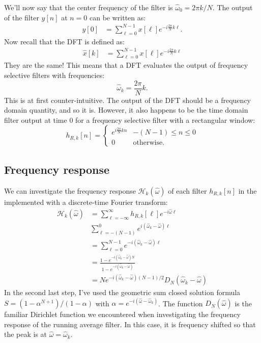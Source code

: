 We'll now say that the center frequency of the filter is $\hat{\omega}_0 = 2\pi k/N$. 
The output of the filter $y[n]$ at $n=0$ can be written as:
\begin{align}
    y[0] & = \sum_{\ell=0}^{N-1} x[\ell] e^{-i\frac{2\pi}{N}k \ell }.
\end{align}
Now recall that the DFT is defined as:
\begin{align}
    \hat{x}[k] & = \sum_{\ell=0}^{N-1} x[\ell]e^{-i \frac{2\pi}{N}k \ell }
\end{align}
They are the same! This means that a DFT evaluates the output of
frequency selective filters with frequencies:
\begin{equation}
    \boxed{
        \hat{\omega}_{k}=\frac{2\pi}{N}k.
    }
\end{equation}
This is at first counter-intuitive. The output of the DFT should be a
frequency domain quantity, and so it is. However, it also happens to
be the time domain filter output at time $0$ for a frequency selective
filter with a rectangular window:
\begin{equation}
    h_{R,k}[n] =\left\{ \begin{array}{cc}
        e^{i \frac{2\pi}{N}k n} & -(N-1) \le n \le 0  \\
        0                       & \mathrm{otherwise}.
    \end{array}
    \right.
\end{equation}

\subsection{Frequency response}

We can investigate the frequency response
$\mathcal{H}_{k}(\hat{\omega})$ of each filter $h_{R,k}[n]$ in
the  implemented with a discrete-time Fourier transform:
\begin{align}
    \mathcal{H}_k(\hat{\omega}) & = \sum_{\ell=-\infty}^{\infty} h_{R,k}[\ell] e^{-i \hat{\omega} \ell}                      \\
                                & \sum_{\ell=-(N-1)}^{0} e^{i (\hat{\omega}_{k}-\hat{\omega}) \ell}                          \\
                                & = \sum_{\ell=0}^{N-1} e^{-i (\hat{\omega}_{k}-\hat{\omega}) \ell}                          \\
                                & = \frac{1-e^{-i (\hat{\omega}_{k}-\hat{\omega})N}}{1-e^{-i (\hat{\omega}_k-\hat{\omega})}} \\
                                & = N e^{-i (\hat{\omega}_{k}-\hat{\omega})(N-1)/2}  D_{N}(\hat{\omega}_k-\hat{\omega})
\end{align}
In the second last step, I've used the geometric sum closed solution
formula $S=(1-\alpha^{N+1})/(1-\alpha)$ with $\alpha=e^{-i
    (\hat{\omega}-\hat{\omega}_{k})}$. The function $D_N(\hat{\omega})$ is
the familiar Dirichlet function we encountered when investigating the
frequency response of the running average filter. In this case, it is
frequency shifted so that the peak is at $\hat{\omega}=\hat{\omega}_k$.

